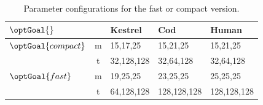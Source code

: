 \begin{table}[h]
    \centering
    \begin{tabular}{lc|lll}
        \toprule
        $\optGoal{}$ & & Kestrel & Cod & Human \\
        \midrule
        $\optGoal{compact}$ & m & 15,17,25 & 15,21,25 & 15,21,25 \\
         & t & 32,128,128 & 32,64,128 & 32,64,128 \\
        \midrule
        $\optGoal{fast}$ & m & 19,25,25 & 23,25,25 & 25,25,25 \\
         & t & 64,128,128 & 128,128,128 & 128,128,128 \\
        \bottomrule
    \end{tabular}
    \caption{Parameter configurations for the fast or compact version.}
    \label{tab:RSHashParetoOptimalParameters}
\end{table}